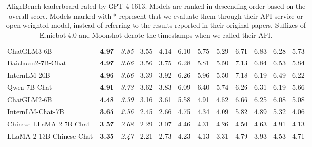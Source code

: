 \begin{table*}[!t]
{\begin{tabular}{@{}l|c|c|cc|c|cccccc@{}}
    ChatGLM3-6B & \textbf{4.97} & \multicolumn{1}{c|}{\textit{3.85}} & 3.55 & 4.14 & \multicolumn{1}{c|}{6.10} & 5.75 & 5.29 & 6.71 & 6.83 & 6.28 & 5.73 \\
    Baichuan2-7B-Chat & \textbf{4.97} & \multicolumn{1}{c|}{\textit{3.66}} & 3.56 & 3.75 & \multicolumn{1}{c|}{6.28} & 5.81 & 5.50 & 7.13 & 6.84 & 6.53 & 5.84 \\
    InternLM-20B & \textbf{4.96} & \multicolumn{1}{c|}{\textit{3.66}} & 3.39 & 3.92 & \multicolumn{1}{c|}{6.26} & 5.96 & 5.50 & 7.18 & 6.19 & 6.49 & 6.22 \\
    Qwen-7B-Chat & \textbf{4.91} & \multicolumn{1}{c|}{\textit{3.73}} & 3.62 & 3.83 & \multicolumn{1}{c|}{6.09} & 6.40 & 5.74 & 6.26 & 6.31 & 6.19 & 5.66 \\
    ChatGLM2-6B & \textbf{4.48} & \multicolumn{1}{c|}{\textit{3.39}} & 3.16 & 3.61 & \multicolumn{1}{c|}{5.58} & 4.91 & 4.52 & 6.66 & 6.25 & 6.08 & 5.08 \\
    InternLM-Chat-7B & \textbf{3.65} & \multicolumn{1}{c|}{\textit{2.56}} & 2.45 & 2.66 & \multicolumn{1}{c|}{4.75} & 4.34 & 4.09 & 5.82 & 4.89 & 5.32 & 4.06 \\
    Chinese-LLaMA-2-7B-Chat & \textbf{3.57} & \multicolumn{1}{c|}{\textit{2.68}} & 2.29 & 3.07 & \multicolumn{1}{c|}{4.46} & 4.31 & 4.26 & 4.50 & 4.63 & 4.91 & 4.13 \\
    LLaMA-2-13B-Chinese-Chat & \textbf{3.35} & \multicolumn{1}{c|}{\textit{2.47}} & 2.21 & 2.73 & \multicolumn{1}{c|}{4.23} & 4.13 & 3.31 & 4.79 & 3.93 & 4.53 & 4.71 \\ \bottomrule
    \end{tabular}
    }
    \caption{
    AlignBench leaderboard rated by GPT-4-0613. 
    Models are ranked in descending order based on the overall score. 
    Models marked with * represent that we evaluate them through their API service or open-weighted model, instead of referring to the results reported in their original papers. 
    Suffixes of Erniebot-4.0 and Moonshot denote the timestamps when we called their API. 
    }
    \label{tab:align_bench_results}
\end{table*}

